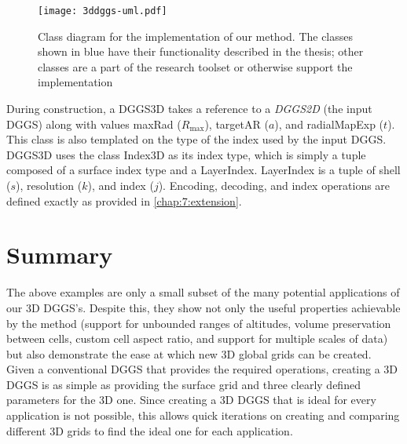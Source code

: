 \begin{figure}[ht!]
	\centering
	\texttt{[image: 3ddggs-uml.pdf]}
	\caption[Class diagram of the grid extension implementation]{
		Class diagram for the implementation of our method. The classes shown in blue have their functionality described in the thesis; other classes are a part of the research toolset or otherwise support the implementation
	}
	\label{fig:uml}
\end{figure}


During construction, a DGGS3D takes a reference to a \textit{DGGS2D} (the input DGGS) along with values maxRad ($R_\mathrm{max}$), targetAR ($a$), and radialMapExp ($t$). This class is also templated on the type of the index used by the input DGGS. DGGS3D uses the class Index3D as its index type, which is simply a tuple composed of a surface index type and a LayerIndex. LayerIndex is a tuple of shell ($s$), resolution ($k$), and index ($j$).
Encoding, decoding, and index operations are defined exactly as provided in \cref{chap:7:extension}.



\section{Summary}
The above examples are only a small subset of the many potential applications of our 3D DGGS's.
Despite this, they show not only the useful properties achievable by the method (support for unbounded ranges of altitudes, volume preservation between cells, custom cell aspect ratio, and support for multiple scales of data) but also demonstrate the ease at which new 3D global grids can be created.
Given a conventional DGGS that provides the required operations, creating a 3D DGGS is as simple as providing the surface grid and three clearly defined parameters for the 3D one.
Since creating a 3D DGGS that is ideal for every application is not possible, this allows quick iterations on creating and comparing different 3D grids to find the ideal one for each application.
